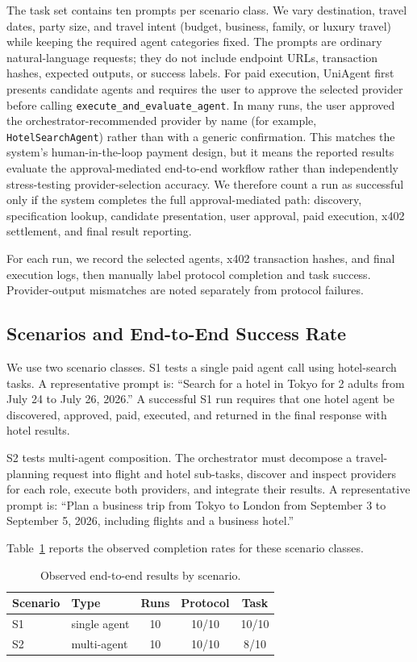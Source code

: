 \documentclass[sigconf]{acmart}
\begin{document}
The task set contains ten prompts per scenario class. We vary destination,
travel dates, party size, and travel intent (budget, business, family,
or luxury travel) while keeping the required agent categories fixed. The
prompts are ordinary natural-language requests; they do not include
endpoint URLs, transaction hashes, expected outputs, or success labels.
For paid execution, UniAgent first presents candidate agents and
requires the user to approve the selected provider before calling
\texttt{execute\_and\_evaluate\_agent}. In many runs, the user approved
the orchestrator-recommended provider by name (for example,
\texttt{HotelSearchAgent}) rather than with a generic confirmation. This
matches the system's human-in-the-loop payment design, but it means the
reported results evaluate the approval-mediated end-to-end workflow
rather than independently stress-testing provider-selection accuracy.
We therefore count a run as successful only if the system completes the
full approval-mediated path: discovery, specification lookup, candidate
presentation, user approval, paid execution, x402 settlement, and final
result reporting.

For each run, we record the selected agents, x402 transaction hashes,
and final execution logs, then manually label protocol completion and
task success. Provider-output mismatches are noted separately from
protocol failures.

\subsection{Scenarios and End-to-End Success Rate}
We use two scenario classes. S1 tests a single paid agent call using
hotel-search tasks. A representative prompt is: ``Search for a hotel in
Tokyo for 2 adults from July 24 to July 26, 2026.'' A successful S1 run
requires that one hotel agent be discovered, approved, paid, executed,
and returned in the final response with hotel results.

S2 tests multi-agent composition. The orchestrator must decompose a
travel-planning request into flight and hotel sub-tasks, discover and
inspect providers for each role, execute both providers, and integrate
their results. A representative prompt is: ``Plan a business trip from
Tokyo to London from September 3 to September 5, 2026, including
flights and a business hotel.''

Table~\ref{tab:scenarios} reports the observed completion rates for
these scenario classes.

\begin{table}[H]
  \centering
  \caption{Observed end-to-end results by scenario.}
  \label{tab:scenarios}
  \small
  \begin{tabular}{@{}llccc@{}}
    \toprule
    Scenario & Type & Runs & Protocol & Task \\
    \midrule
    S1 & single agent & 10 & 10/10 & 10/10 \\
    S2 & multi-agent  & 10 & 10/10 & 8/10 \\
    \bottomrule
  \end{tabular}
\end{table}
\end{document}

